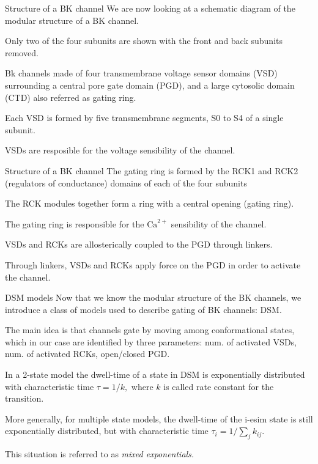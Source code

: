 \documentclass[t]{beamer}
\newcommand{\ca}{\text{Ca}^{2+}}
\begin{document}
\begin{frame}{Structure of a BK channel}
We are now looking at a schematic diagram of the modular structure of a BK channel.

Only two of the four subunits are shown with the front and back subunits removed.

Bk channels made of four transmembrane voltage sensor domains (VSD) surrounding a central pore gate domain (PGD), and a large cytosolic domain (CTD) also referred as gating ring.

Each VSD is formed by five transmembrane segments, S0 to S4 of a single subunit.

VSDs are resposible for the voltage sensibility of the channel.

\end{frame}

\begin{frame}{Structure of a BK channel}
The gating ring is formed by the RCK1 and RCK2 (regulators of conductance) domains of each of the four subunits

The RCK modules together form a ring with a central opening (gating ring).

The gating ring is responsible for the $\ca$ sensibility of the channel.

VSDs and RCKs are allosterically coupled to the PGD through linkers.

Through linkers, VSDs and RCKs apply force on the PGD in order to activate the channel.
\end{frame}

\begin{frame}{DSM models}
    Now that we know the modular structure of the BK channels, we introduce a class of models used to describe gating of BK channels: DSM.

    The main idea is that channels gate by moving among conformational states, which in our case are identified by three parameters: num. of activated VSDs, num. of activated RCKs, open/closed PGD.

    In a 2-state model the dwell-time of a state in DSM is exponentially distributed with characteristic time $\tau = 1/k,$ where $k$ is called rate constant for the transition.

    More generally, for multiple state models, the dwell-time of the i-esim state is still exponentially distributed, but with characteristic time $\tau_i = 1/\sum_j k_{ij}.$

    This situation is referred to as \emph{mixed exponentials.}


\end{frame}
\end{document}
